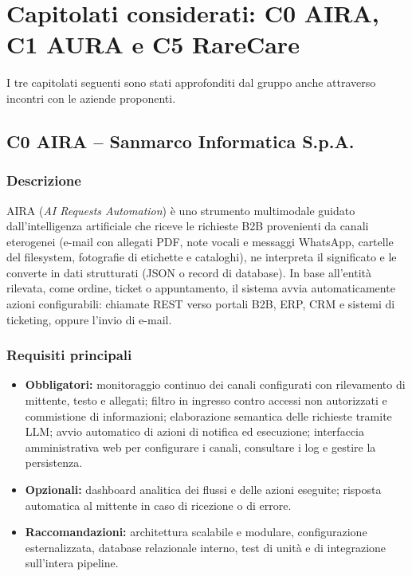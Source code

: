 \section{Capitolati considerati: C0 AIRA, C1 AURA e C5 RareCare}

I tre capitolati seguenti sono stati approfonditi dal gruppo anche attraverso incontri con le aziende proponenti.

\subsection{C0 AIRA -- Sanmarco Informatica S.p.A.}

\subsubsection*{Descrizione}

AIRA (\emph{AI Requests Automation}) è uno strumento multimodale guidato dall'intelligenza artificiale che riceve le richieste B2B provenienti da canali eterogenei (e-mail con allegati PDF, note vocali e messaggi WhatsApp, cartelle del filesystem, fotografie di etichette e cataloghi), ne interpreta il significato e le converte in dati strutturati (JSON o record di database). In base all'entità rilevata, come ordine, ticket o appuntamento, il sistema avvia automaticamente azioni configurabili: chiamate REST verso portali B2B, ERP, CRM e sistemi di ticketing, oppure l'invio di e-mail.

\subsubsection*{Requisiti principali}

\begin{itemize}
    \item \textbf{Obbligatori:} monitoraggio continuo dei canali configurati con rilevamento di mittente, testo e allegati; filtro in ingresso contro accessi non autorizzati e commistione di informazioni; elaborazione semantica delle richieste tramite LLM; avvio automatico di azioni di notifica ed esecuzione; interfaccia amministrativa web per configurare i canali, consultare i log e gestire la persistenza.
    \item \textbf{Opzionali:} dashboard analitica dei flussi e delle azioni eseguite; risposta automatica al mittente in caso di ricezione o di errore.
    \item \textbf{Raccomandazioni:} architettura scalabile e modulare, configurazione esternalizzata, database relazionale interno, test di unità e di integrazione sull'intera pipeline.
\end{itemize}

